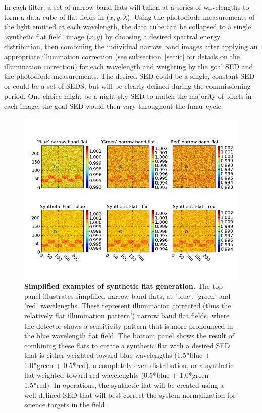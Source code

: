 \documentclass[12pt,preprint]{aastex}
\begin{document}
In each filter, a set of narrow band flats will taken at a series of
wavelengths to form a data cube of flat fields in
($x,y,\lambda$). Using the photodiode measurements of the light
emitted at each wavelength, the data cube can be collapsed to a single
`synthetic flat field' image ($x,y$) by choosing a desired spectral
energy distribution, then combining the individual narrow band images
after applying an appropriate illumination correction (see
subsection~\ref{sec:ic} for details on the illumination correction) for each
wavelength and weighting by the goal SED and the photodiode
measurements. The desired SED could be a single, constant SED or could
be a set of SEDS, but will be clearly defined during the commissioning
period. One choice might be a night sky SED to match the majority of
pixels in each image; the goal SED would then vary throughout the
lunar cycle.

\begin{figure}[htbp]
\includegraphics[width=6in]{narrowband_flat}
\caption{ {\small
{\bf Simplified examples of synthetic flat generation.} 
The top panel illustrates simplified narrow band flats, at 'blue',
'green' and 'red' wavelengths. These represent illumination corrected
(thus the relatively flat illumination pattern!) narrow band flat
fields, where the detector shows a sensitivity pattern that is more
pronounced in the blue wavelength flat field. The bottom panel shows
the result of combining these flats to create a synthetic flat with a
desired SED that is either weighted toward blue wavelengths (1.5*blue
+ 1.0*green + 0.5*red), a completely even distribution, or a synthetic
flat weighted toward red wavelenghts (0.5*blue + 1.0*green + 1.5*red).
In operations, the synthetic flat will be created using a well-defined
SED that will best correct the system normalization for science
targets in the field. }}
\label{fig:narrowband}
\end{figure}
\end{document}
